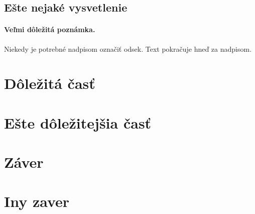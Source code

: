 \documentclass[10pt,twoside,english,a4paper]{article}
\begin{document}
\subsection{Ešte nejaké vysvetlenie} \label{ina:este}

\paragraph{Veľmi dôležitá poznámka.}
Niekedy je potrebné nadpisom označiť odsek. Text pokračuje hneď za nadpisom.



\section{Dôležitá časť} \label{dolezita}




\section{Ešte dôležitejšia časť} \label{dolezitejsia}




\section{Záver} \label{zaver} %

\section{Iny zaver}






\end{document}

